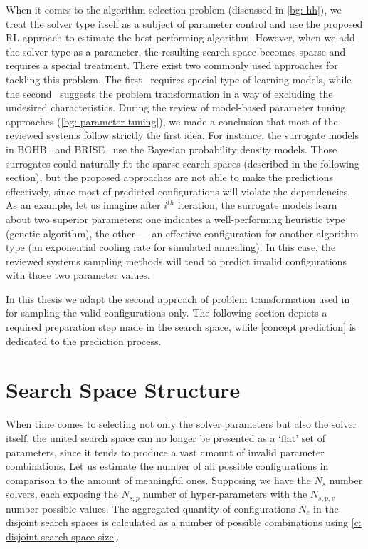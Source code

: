When it comes to the algorithm selection problem (discussed in \cref{bg: hh}), we treat the solver type itself as a subject of parameter control and use the proposed RL approach to estimate the best performing algorithm. However, when we add the solver type as a parameter, the resulting search space becomes sparse and requires a special treatment. There exist two commonly used approaches for tackling this problem. The first~\cite{hutter2011sequential,falkner2018bohb,brise2spl} requires special type of learning models, while the second~\cite{lopez2016irace} suggests the problem transformation in a way of excluding the undesired characteristics. During the review of model-based parameter tuning approaches (\cref{bg: parameter tuning}), we made a conclusion that most of the reviewed systems follow strictly the first idea. For instance, the surrogate models in BOHB~\cite{falkner2018bohb} and BRISE~\cite{brise2spl} use the Bayesian probability density models. Those surrogates could naturally fit the sparse search spaces (described in the following section), but the proposed approaches are not able to make the predictions effectively, since most of predicted configurations will violate the dependencies. As an example, let us imagine after $i^{th}$ iteration, the surrogate models learn about two superior parameters: one indicates a well-performing heuristic type (genetic algorithm), the other — an effective configuration for another algorithm type (an exponential cooling rate for simulated annealing). In this case, the reviewed systems sampling methods will tend to predict invalid configurations with those two parameter values.

In this thesis we adapt the second approach of problem transformation used in~\cite{lopez2016irace} for sampling the valid configurations only. The following section depicts a required preparation step made in the search space, while \cref{concept:prediction} is dedicated to the prediction process.


\section{Search Space Structure}\label{concept:search space}
When time comes to selecting not only the solver parameters but also the solver itself, the united search space can no longer be presented as a `flat' set of parameters, since it tends to produce a vast amount of invalid parameter combinations. Let us estimate the number of all possible configurations in comparison to the amount of meaningful ones. Supposing we have the $N_s$ number solvers, each exposing the $N_{s,p}$ number of hyper-parameters with the $N_{s,p,v}$ number possible values. The aggregated quantity of configurations $N_c$ in the disjoint search spaces is calculated as a number of possible combinations using \cref{c: disjoint search space size}.

